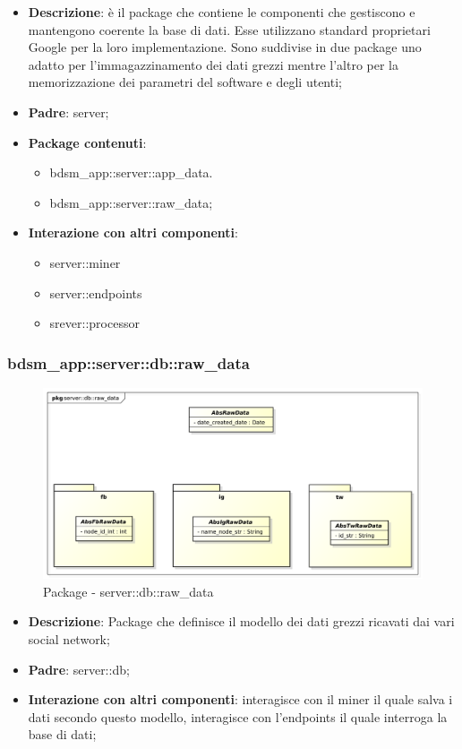 	\begin{itemize}
		\item \textbf{Descrizione}: è il package che contiene le componenti che gestiscono e mantengono coerente la base di dati. Esse utilizzano standard proprietari Google per la loro implementazione. Sono suddivise in due package uno adatto per l'immagazzinamento dei dati grezzi mentre l'altro per la memorizzazione dei parametri del software e degli utenti;
		\item \textbf{Padre}: server;
		\item \textbf{Package contenuti}:
			\begin{itemize}
				\item bdsm\_app::server::app\_data.
				\item bdsm\_app::server::raw\_data;
			\end{itemize}
		\item \textbf{Interazione con altri componenti}:
			\begin{itemize}
				\item server::miner
				\item server::endpoints
				\item srever::processor
			\end{itemize}
	\end{itemize}



\subsubsection{bdsm\_app::server::db::raw\_data} %
\label{ssub:bdsm_app_server_raw_model}

	\begin{figure}[htbp]
		\centering
		\centerline{\includegraphics[scale=0.35]{./images/server/raw_data.pdf}}
		\caption{Package - server::db::raw\_data}
	\end{figure}
	\begin{itemize}
	\item \textbf{Descrizione}: Package che definisce il modello dei dati grezzi ricavati dai vari social network;
		\item \textbf{Padre}: server::db;
		\item \textbf{Interazione con altri componenti}: interagisce con il miner il quale salva i dati secondo questo modello, interagisce con l'endpoints il quale interroga la base di dati;
	\end{itemize}


